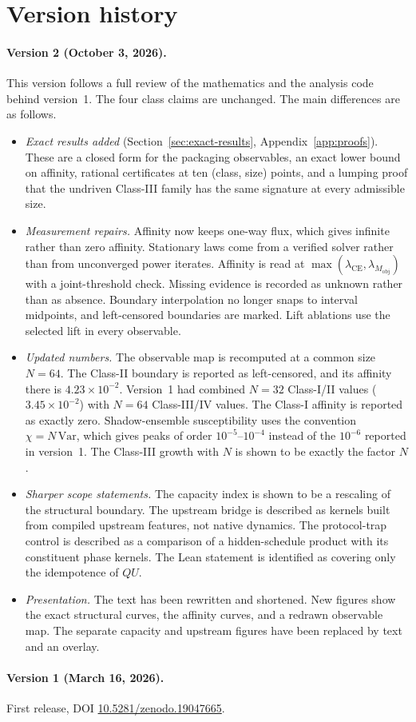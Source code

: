 \section{Version history}
\label{app:version-history}

\paragraph{Version 2 (October 3, 2026).} This version follows a full review of the mathematics and the analysis code behind version~1. The four class claims are unchanged. The main differences are as follows.
\begin{itemize}
  \item \emph{Exact results added} (Section~\ref{sec:exact-results}, Appendix~\ref{app:proofs}). These are a closed form for the packaging observables, an exact lower bound on affinity, rational certificates at ten (class, size) points, and a lumping proof that the undriven Class-III family has the same signature at every admissible size.
  \item \emph{Measurement repairs.} Affinity now keeps one-way flux, which gives infinite rather than zero affinity. Stationary laws come from a verified solver rather than from unconverged power iterates. Affinity is read at $\max(\lambda_{\mathrm{CE}},\lambda_{M_{\mathrm{obj}}})$ with a joint-threshold check. Missing evidence is recorded as unknown rather than as absence. Boundary interpolation no longer snaps to interval midpoints, and left-censored boundaries are marked. Lift ablations use the selected lift in every observable.
  \item \emph{Updated numbers.} The observable map is recomputed at a common size $N=64$. The Class-II boundary is reported as left-censored, and its affinity there is $4.23\times10^{-2}$. Version~1 had combined $N=32$ Class-I/II values ($3.45\times10^{-2}$) with $N=64$ Class-III/IV values. The Class-I affinity is reported as exactly zero. Shadow-ensemble susceptibility uses the convention $\chi=N\,\mathrm{Var}$, which gives peaks of order $10^{-5}$--$10^{-4}$ instead of the $10^{-6}$ reported in version~1. The Class-III growth with $N$ is shown to be exactly the factor $N$.
  \item \emph{Sharper scope statements.} The capacity index is shown to be a rescaling of the structural boundary. The upstream bridge is described as kernels built from compiled upstream features, not native dynamics. The protocol-trap control is described as a comparison of a hidden-schedule product with its constituent phase kernels. The Lean statement is identified as covering only the idempotence of $QU$.
  \item \emph{Presentation.} The text has been rewritten and shortened. New figures show the exact structural curves, the affinity curves, and a redrawn observable map. The separate capacity and upstream figures have been replaced by text and an overlay.
\end{itemize}

\paragraph{Version 1 (March 16, 2026).} First release, DOI \href{https://doi.org/10.5281/zenodo.19047665}{10.5281/zenodo.19047665}.
